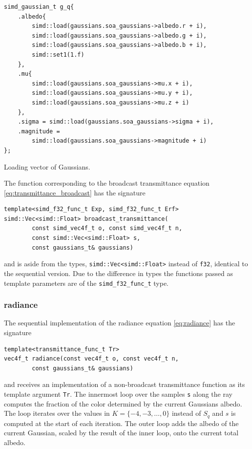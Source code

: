 \documentclass[a4paper, 11pt]{memoir}
\begin{document}
    \begin{listing}[t]
        \begin{verbatim}
simd_gaussian_t g_q{
    .albedo{
        simd::load(gaussians.soa_gaussians->albedo.r + i),
        simd::load(gaussians.soa_gaussians->albedo.g + i),
        simd::load(gaussians.soa_gaussians->albedo.b + i),
        simd::set1(1.f)
    },
    .mu{
        simd::load(gaussians.soa_gaussians->mu.x + i),
        simd::load(gaussians.soa_gaussians->mu.y + i),
        simd::load(gaussians.soa_gaussians->mu.z + i)
    },
    .sigma = simd::load(gaussians.soa_gaussians->sigma + i),
    .magnitude =
        simd::load(gaussians.soa_gaussians->magnitude + i)
};
        \end{verbatim}
        \caption{Loading vector of Gaussians.}
        \label{lst:gaussian_load}
    \end{listing}

    The function corresponding to the broadcast \gls{transmittance} equation \eqref{eq:transmittance_broadcast} has the
    signature
    \begin{verbatim}
template<simd_f32_func_t Exp, simd_f32_func_t Erf>
simd::Vec<simd::Float> broadcast_transmittance(
        const simd_vec4f_t o, const simd_vec4f_t n,
        const simd::Vec<simd::Float> s,
        const gaussians_t& gaussians)
    \end{verbatim}
    and is aside from the types, \texttt{simd::Vec<simd::Float>} instead of \texttt{f32}, identical
    to the sequential version. Due to the difference in types the functions passed as template parameters are of the
    \texttt{simd_f32_func_t} type.
    
    \subsubsection{\gls{radiance}}
    The sequential implementation of the \gls{radiance} equation \eqref{eq:radiance} has the signature
    \begin{verbatim}
template<transmittance_func_t Tr>
vec4f_t radiance(const vec4f_t o, const vec4f_t n,
        const gaussians_t& gaussians)
    \end{verbatim}
    and receives an implementation of a non-broadcast \gls{transmittance} function as its template argument
    \texttt{Tr}. The innermost loop over the samples \texttt{s} along the ray computes the fraction
    of the color determined by the current Gaussians \gls{albedo}. The loop iterates over the values in
    $K = \{-4, -3, \dots, 0\}$ instead of $S_q$ and $s$ is computed at the start of each iteration. The outer loop adds the
    \gls{albedo} of the current Gaussian, scaled by the result of the inner loop, onto the current total \gls{albedo}.
    
\end{document}
